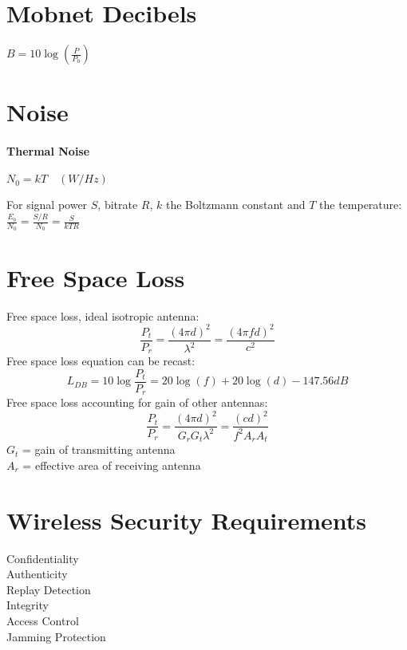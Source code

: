\documentclass[11pt, a4paper,twocolumn]{scrartcl}
\begin{document}
\section{Mobnet Decibels}
$B = 10\log(\frac{P}{P_0})$

\section{Noise}
\paragraph{Thermal Noise}$N_0 = kT\quad(W/Hz)$

For signal power $S$, bitrate $R$, $k$ the Boltzmann constant and $T$ the temperature: $\frac{E_b}{N_0} = \frac{S/R}{N_0} = \frac{S}{kTR}$

\section{Free Space Loss}
Free space loss, ideal isotropic antenna:
$$ \frac{P_t}{P_r} = \frac{(4\pi d)^2}{\lambda^2} = \frac{(4\pi fd)^2}{c^2} $$
Free space loss equation can be recast:
$$L_{DB} = 10\log \frac{P_t}{P_r} = 20 \log(f) +20\log(d) - 147.56 dB$$
Free space loss accounting for gain of other antennas: 
$$\frac{P_t}{P_r} = \frac{(4\pi d)^2}{G_rG_t\lambda^2} = \frac{(cd)^2}{f^2A_rA_t}$$
$G_t$ = gain of transmitting antenna\\
$A_r$ = effective area of receiving antenna

\section{Wireless Security Requirements}

\begin{multicols}{2}
	\begin{description}
		\item[Confidentiality]
		\item[Authenticity]
		\item[Replay Detection]
		\item[Integrity]
		\item[Access Control]
		\item[Jamming Protection]
	\end{description}
\end{multicols}
\end{document}
